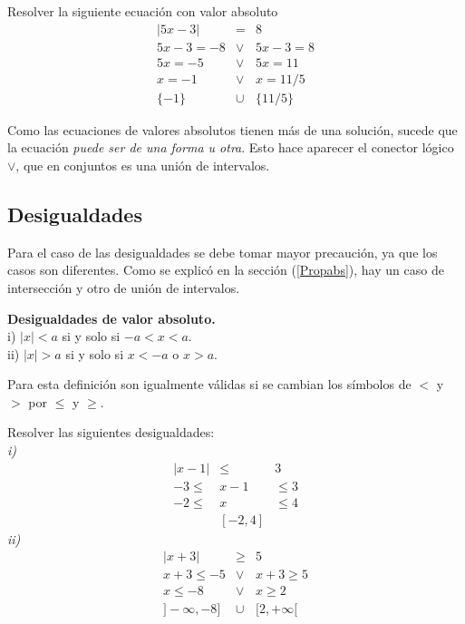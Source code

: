 \begin{myexample}
Resolver la siguiente ecuación con valor absoluto
\begin{eqnarray*}
|5x-3|&=&8\\
5x-3=-8 &\vee & 5x-3=8\\
5x=-5 &\vee & 5x=11\\
x=-1 &\vee & x=11/5\\
\{-1\} &\cup & \{11/5\}
\end{eqnarray*}
\end{myexample}
Como las ecuaciones de valores absolutos tienen más de una solución, sucede que la ecuación \textit{puede ser de una forma u otra}. Esto hace aparecer el conector lógico $\vee$, que en conjuntos es una unión de intervalos.\\

\subsection{Desigualdades}

Para el caso de las desigualdades se debe tomar mayor precaución, ya que los casos son diferentes. Como se explicó en la sección (\ref{Propabs}), hay un caso de intersección y otro de unión de intervalos.\\

\begin{mydef}
\textbf{Desigualdades de valor absoluto.}\\

\noindent i) $|x|<a$ si y solo si $-a<x<a$.\\
\noindent ii) $|x|>a$ si y solo si $x<-a$ o $x>a$.
\end{mydef}
Para esta definición son igualmente válidas si se cambian los símbolos de $<$ y $>$ por $\leq$ y $\geq$.

\begin{myexample}
\label{ejemplodosd}
Resolver las siguientes desigualdades:\\

\textit{i)}\\
\begin{eqnarray*}
|x-1|&\leq &  3\\
-3 \leq & x-1 &\leq 3 \\
-2 \leq & x &\leq  4 \\
&[-2,4]&
\end{eqnarray*}
\textit{ii)}\\
\begin{eqnarray*}
|x+3|&\geq & 5 \\
x+3\leq -5 &\vee &x+3\geq 5\\
x\leq -8 &\vee &x\geq 2\\
]-\infty,-8]&\cup & [2,+\infty [
\end{eqnarray*}
\end{myexample}

